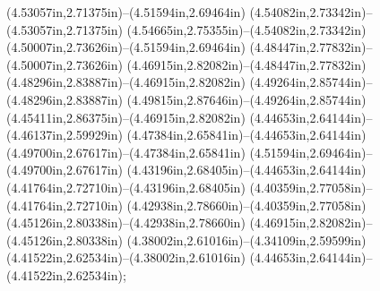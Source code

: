 (4.53057in,2.71375in)--(4.51594in,2.69464in) (4.54082in,2.73342in)--(4.53057in,2.71375in) (4.54665in,2.75355in)--(4.54082in,2.73342in) (4.50007in,2.73626in)--(4.51594in,2.69464in) (4.48447in,2.77832in)--(4.50007in,2.73626in) (4.46915in,2.82082in)--(4.48447in,2.77832in) (4.48296in,2.83887in)--(4.46915in,2.82082in) (4.49264in,2.85744in)--(4.48296in,2.83887in) (4.49815in,2.87646in)--(4.49264in,2.85744in) (4.45411in,2.86375in)--(4.46915in,2.82082in) (4.44653in,2.64144in)--(4.46137in,2.59929in) (4.47384in,2.65841in)--(4.44653in,2.64144in) (4.49700in,2.67617in)--(4.47384in,2.65841in) (4.51594in,2.69464in)--(4.49700in,2.67617in) (4.43196in,2.68405in)--(4.44653in,2.64144in) (4.41764in,2.72710in)--(4.43196in,2.68405in) (4.40359in,2.77058in)--(4.41764in,2.72710in) (4.42938in,2.78660in)--(4.40359in,2.77058in) (4.45126in,2.80338in)--(4.42938in,2.78660in) (4.46915in,2.82082in)--(4.45126in,2.80338in) (4.38002in,2.61016in)--(4.34109in,2.59599in) (4.41522in,2.62534in)--(4.38002in,2.61016in) (4.44653in,2.64144in)--(4.41522in,2.62534in);
